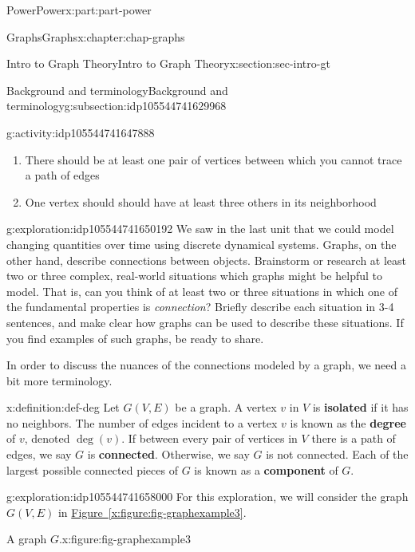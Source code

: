 \documentclass[oneside,10pt,]{book}
\newcommand{\xreffont}{\relax}
\newcommand{\terminology}[1]{\textbf{#1}}
\numberwithin{equation}{section}
\begin{document}
\begin{partptx}{Power}{}{Power}{}{}{x:part:part-power}
\begin{chapterptx}{Graphs}{}{Graphs}{}{}{x:chapter:chap-graphs}
\begin{sectionptx}{Intro to Graph Theory}{}{Intro to Graph Theory}{}{}{x:section:sec-intro-gt}
\begin{subsectionptx}{Background and terminology}{}{Background and terminology}{}{}{g:subsection:idp105544741629968}
\begin{activity}{}{g:activity:idp105544741647888}
\begin{enumerate}
\item{}There should be at least one pair of vertices between which you cannot trace a path of edges%
\item{}One vertex should should have at least three others in its neighborhood%
\end{enumerate}
\end{activity}%
\begin{exploration}{}{g:exploration:idp105544741650192}%
We saw in the last unit that we could model changing quantities over time using discrete dynamical systems. Graphs, on the other hand, describe connections between objects. Brainstorm or research at least two or three complex, real-world situations which graphs might be helpful to model. That is, can you think of at least two or three situations in which one of the fundamental properties is \emph{connection}? Briefly describe each situation in 3-4 sentences, and make clear how graphs can be used to describe these situations. If you find examples of such graphs, be ready to share.%
\end{exploration}%
In order to discuss the nuances of the connections modeled by a graph, we need a bit more terminology.%
\begin{definition}{}{x:definition:def-deg}%
Let \(G(V,E)\) be a graph. A vertex \(v\) in \(V\) is \terminology{isolated} if it has no neighbors. The number of edges incident to a vertex \(v\) is known as the \terminology{degree} of \(v\), denoted \(\deg(v)\). If between every pair of vertices in \(V\) there is a path of edges, we say \(G\) is \terminology{connected}. Otherwise, we say \(G\) is not connected. Each of the largest possible connected pieces of \(G\) is known as a \terminology{component} of \(G\).%
\end{definition}
\begin{exploration}{}{g:exploration:idp105544741658000}%
For this exploration, we will consider the graph \(G(V,E)\) in \hyperref[x:figure:fig-graphexample3]{Figure~{\xreffont\ref{x:figure:fig-graphexample3}}}.%
\begin{figureptx}{A graph \(G\).}{x:figure:fig-graphexample3}{}%
\begin{image}{0.25}{0.5}{0.25}%

\end{image}
\end{figureptx}
\end{exploration}
\end{subsectionptx}
\end{sectionptx}
\end{chapterptx}
\end{partptx}
\end{document}
